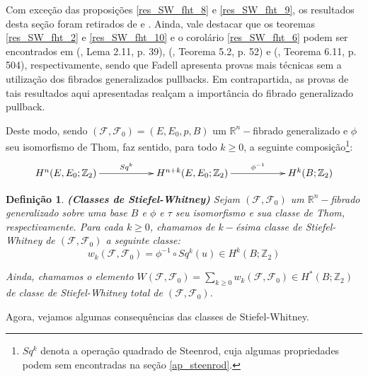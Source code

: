 \documentclass[12pt,oneside]{book} %
\newtheorem{defi}   {\hspace{0.5cm}Defini\c c\~ao}[chapter]
\newcommand{\ds}{\displaystyle}
\newcommand{\R}{\mathbb{R}}
\newcommand{\Z}{\mathbb{Z}}
\begin{document}
\par Com exceção das proposições \ref{res_SW_fht_8} e \ref{res_SW_fht_9}, os resultados desta seção foram retirados de \cite{fadell_1} e \cite{fadell_4}. Ainda, vale destacar que os teoremas \ref{res_SW_fht_2} e \ref{res_SW_fht_10} e o corolário \ref{res_SW_fht_6} podem ser encontrados em (\cite{fadell_4}, Lema 2.11, p. 39), (\cite{fadell_4}, Teorema 5.2, p. 52) e (\cite{fadell_1}, Teorema 6.11, p. 504), respectivamente, sendo que Fadell apresenta provas mais técnicas sem a utilização dos fibrados generalizados pullbacks. Em contrapartida, as provas de tais resultados aqui apresentadas realçam a importância do fibrado generalizado pullback.

\par Deste modo, sendo $(\mathcal{F},\mathcal{F}_{0})=(E,E_{0},p,B)$ um $\R^{n}-$fibrado generalizado e $\phi$ seu isomorfismo de Thom, faz sentido, para todo $k\geq 0$, a seguinte composição\footnote{$Sq^{k}$ denota a operação quadrado de Steenrod, cuja algumas propriedades podem sem encontradas na seção \ref{ap_steenrod}.}:
$$ \xymatrix @C=0.5cm {
	H^{n}(E,E_{0};\Z_{2}) \ar[rrr]^-{Sq^{k}} &&& H^{n+k}(E,E_{0};\Z_{2}) \ar[rrr]^-{\phi^{-1}} &&& H^{k}(B;\Z_{2})
} $$

\begin{defi}{\bf (Classes de Stiefel-Whitney)}
	Sejam $(\mathcal{F},\mathcal{F}_{0})$ um $\R^{n}-$fibrado generalizado sobre uma base $B$ e $\phi$ e $\tau$ seu isomorfismo e sua classe de Thom, respectivamente. Para cada $k\geq 0$, chamamos de $k-$ésima classe de Stiefel-Whitney de $(\mathcal{F},\mathcal{F}_{0})$ a seguinte classe:	
	$$ w_{k}(\mathcal{F},\mathcal{F}_{0})=\phi^{-1}\circ Sq^{k}(u)\in H^{k}(B;\Z_{2}) $$
	
	\par Ainda, chamamos o elemento $W(\mathcal{F},\mathcal{F}_{0})=\ds\sum_{k\geq 0}w_{k}(\mathcal{F},\mathcal{F}_{0})\in H^{*}(B;\Z_{2})$ de classe de Stiefel-Whitney total de $(\mathcal{F},\mathcal{F}_{0})$.
\end{defi}

\par Agora, vejamos algumas consequências das classes de Stiefel-Whitney.
\end{document}
